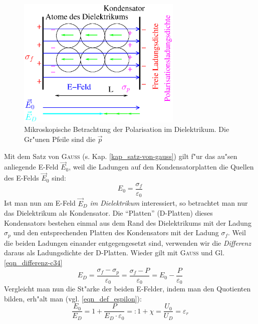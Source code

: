 \begin{figure}
   \centering
   \includegraphics[width=0.7\textwidth]{bilder/dielektrikum}
   \caption[Polarisation im Dielektrikum]{Mikroskopische Betrachtung
     der Polarisation im Dielektrikum. Die Gr"unen Pfeile sind die
     $\vec p$}
   \label{abb_polarisation_dielektrikum}
\end{figure}


\bigskip

Mit dem Satz von \textsc{Gauss} (s. Kap. \ref{kap_satz-von-gauss})
gilt f"ur das au"sen anliegende E-Feld $\vec E_0$, weil die Ladungen auf
den Kondensatorplatten die Quellen des E-Felds $\vec E_0$ sind:
\begin{equation}
   \label{eqn_differenz-c36}
   E_0 = \frac{\sigma_f}{\varepsilon_0}
\end{equation}
Ist man nun am E-Feld $\vec E_D$ \emph{im Dielektrikum} interessiert,
so betrachtet man nur das Dielektrikum als Kondensator. Die
"`Platten"' (D-Platten) dieses Kondensators bestehen einmal aus dem
Rand des Dielektrikums mit der Ladung $\sigma_p$ und den
entsprechenden Platten des Kondensators mit der Ladung
$\sigma_f$. Weil die beiden Ladungen einander entgegengesetzt sind,
verwenden wir die \emph{Differenz} daraus als Ladungsdichte der
D-Platten. Wieder gilt mit \textsc{Gauss} und Gl. \eqref{eqn_differenz-c34}
\begin{equation}
   \label{eqn_differenz-c37}
   E_D = \frac{\sigma_f - \sigma_p}{\varepsilon_0} = \frac{\sigma_f -
     P}{\varepsilon_0} = E_0 -  \frac{P}{\varepsilon_0}
\end{equation}
Vergleicht man nun die St"arke der beiden E-Felder, indem man den
Quotienten bilden, erh"alt man (vgl. \eqref{eqn_def_espilon}):
\begin{equation}
   \label{eqn_differenz-c39}
   \frac{E_0}{E_D} = 1 + \frac{P}{E_D \cdot \varepsilon_0} =: 1 + \chi
   = \frac{U_0}{U_D} = \varepsilon_r
\end{equation}


